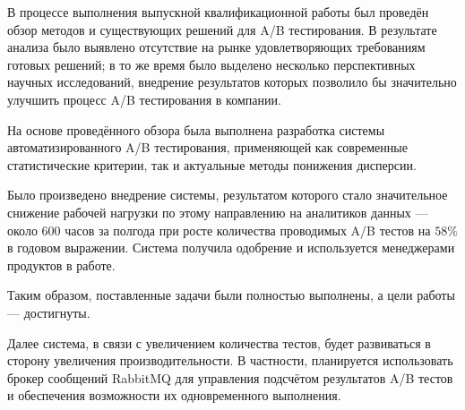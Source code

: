 \documentclass[../document.tex]{subfiles}
\begin{document}
	\par В процессе выполнения выпускной квалификационной работы был проведён обзор методов и существующих решений для A/B тестирования. В результате анализа было выявлено отсутствие на рынке удовлетворяющих требованиям готовых решений; в то же время было выделено несколько перспективных научных исследований, внедрение результатов которых позволило бы значительно улучшить процесс A/B тестирования в компании.
	\par На основе проведённого обзора была выполнена разработка системы автоматизированного A/B тестирования, применяющей как современные статистические критерии, так и актуальные методы понижения дисперсии.
	\par Было произведено внедрение системы, результатом которого стало значительное снижение рабочей нагрузки по этому направлению на аналитиков данных --- около 600 часов за полгода при росте количества проводимых A/B тестов на $58\%$ в годовом выражении. Система получила одобрение и используется менеджерами продуктов в работе.
	\par Таким образом, поставленные задачи были полностью выполнены, а цели работы --- достигнуты.
	\par Далее система, в связи с увеличением количества тестов, будет развиваться в сторону увеличения производительности. В частности, планируется использовать брокер сообщений RabbitMQ для управления подсчётом результатов A/B тестов и обеспечения возможности их одновременного выполнения.
\end{document}
